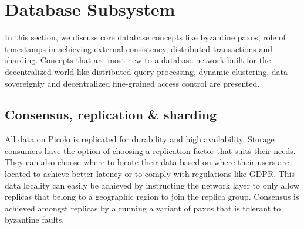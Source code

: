 \section{Database Subsystem}
In this section, we discuss core database concepts like byzantine paxos, role of timestamps in achieving external consistency, distributed transactions and sharding. Concepts that are most new to a database network built for the  decentralized world like distributed query processing, dynamic clustering, data sovereignty and decentralized fine-grained access control are presented.

\subsection{Consensus, replication \& sharding} \label{sec:paxos}
All data on \textsf{Picolo} is replicated for durability and high availability. Storage consumers have the option of choosing a replication factor that suits their needs. They can also choose where to locate their data based on where their users are located to achieve better latency or to comply with regulations like GDPR. This data locality can easily be achieved by instructing the network layer to only allow replicas that belong to a geographic region to join the replica group. Consensus is achieved amongst replicas by a running a variant of paxos that is tolerant to byzantine faults.
